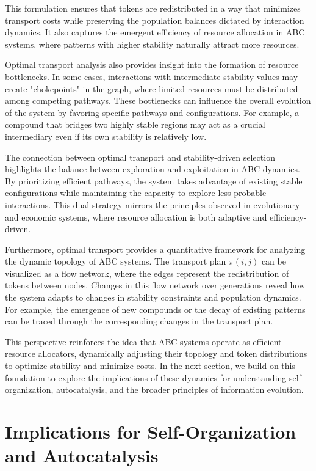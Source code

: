 \documentclass[%
 preprint, linenumbers,
 amsmath,amssymb,
 aps, physrev,
]{revtex4-2}
\begin{document}
This formulation ensures that tokens are redistributed in a way that minimizes transport costs while preserving the population balances dictated by interaction dynamics. It also captures the emergent efficiency of resource allocation in ABC systems, where patterns with higher stability naturally attract more resources.

Optimal transport analysis also provides insight into the formation of resource bottlenecks. In some cases, interactions with intermediate stability values may create "chokepoints" in the graph, where limited resources must be distributed among competing pathways. These bottlenecks can influence the overall evolution of the system by favoring specific pathways and configurations. For example, a compound that bridges two highly stable regions may act as a crucial intermediary even if its own stability is relatively low.

The connection between optimal transport and stability-driven selection highlights the balance between exploration and exploitation in ABC dynamics. By prioritizing efficient pathways, the system takes advantage of existing stable configurations while maintaining the capacity to explore less probable interactions. This dual strategy mirrors the principles observed in evolutionary and economic systems, where resource allocation is both adaptive and efficiency-driven.

Furthermore, optimal transport provides a quantitative framework for analyzing the dynamic topology of ABC systems. The transport plan $\pi(i, j)$ can be visualized as a flow network, where the edges represent the redistribution of tokens between nodes. Changes in this flow network over generations reveal how the system adapts to changes in stability constraints and population dynamics. For example, the emergence of new compounds or the decay of existing patterns can be traced through the corresponding changes in the transport plan.

This perspective reinforces the idea that ABC systems operate as efficient resource allocators, dynamically adjusting their topology and token distributions to optimize stability and minimize costs. In the next section, we build on this foundation to explore the implications of these dynamics for understanding self-organization, autocatalysis, and the broader principles of information evolution.

\section{Implications for Self-Organization and Autocatalysis}
\end{document}
